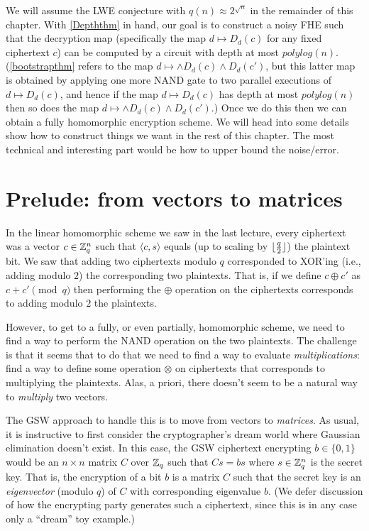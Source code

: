 We will assume the LWE conjecture with \(q(n) \approx 2^{\sqrt{n}}\) in
the remainder of this chapter. With \cref{Depththm} in hand, our goal is
to construct a noisy FHE such that the decryption map (specifically the
map \(d \mapsto D_d(c)\) for any fixed ciphertext \(c\)) can be computed
by a circuit with depth at most \(polylog(n)\). (\cref{bootstrapthm}
refers to the map \(d \mapsto \wedge{D_d(c) \wedge D_d(c')}\), but this
latter map is obtained by applying one more NAND gate to two parallel
executions of \(d \mapsto D_d(c)\), and hence if the map
\(d \mapsto D_d(c)\) has depth at most \(polylog(n)\) then so does the
map \(d \mapsto \wedge{D_d(c) \wedge D_d(c')}\).) Once we do this then
we can obtain a fully homomorphic encryption scheme. We will head into
some details show how to construct things we want in the rest of this
chapter. The most technical and interesting part would be how to upper
bound the noise/error.

\section{Prelude: from vectors to
matrices}\label{15-Prelude-from-vectors-t}

In the linear homomorphic scheme we saw in the last lecture, every
ciphertext was a vector \(c\in{\mathbb{Z}}_q^n\) such that \(\langle c,s \rangle\)
equals (up to scaling by \(\lfloor \tfrac{q}{2} \rfloor\)) the plaintext bit. We
saw that adding two ciphertexts modulo \(q\) corresponded to XOR'ing
(i.e., adding modulo \(2\)) the corresponding two plaintexts. That is,
if we define \(c \oplus c'\) as \(c+c' \pmod{q}\) then performing the
\(\oplus\) operation on the ciphertexts corresponds to adding modulo
\(2\) the plaintexts.

However, to get to a fully, or even partially, homomorphic scheme, we
need to find a way to perform the NAND operation on the two plaintexts.
The challenge is that it seems that to do that we need to find a way to
evaluate \emph{multiplications}: find a way to define some operation
\(\otimes\) on ciphertexts that corresponds to multiplying the
plaintexts. Alas, a priori, there doesn't seem to be a natural way to
\emph{multiply} two vectors.

The GSW approach to handle this is to move from vectors to
\emph{matrices}. As usual, it is instructive to first consider the
cryptographer's dream world where Gaussian elimination doesn't exist. In
this case, the GSW ciphertext encrypting \(b\in\{0,1\}\) would be an
\(n\times n\) matrix \(C\) over \({\mathbb{Z}}_q\) such that \(Cs = bs\) where
\(s\in{\mathbb{Z}}_q^n\) is the secret key. That is, the encryption of a bit \(b\)
is a matrix \(C\) such that the secret key is an \emph{eigenvector}
(modulo \(q\)) of \(C\) with corresponding eigenvalue \(b\). (We defer
discussion of how the encrypting party generates such a ciphertext,
since this is in any case only a ``dream'' toy example.)

